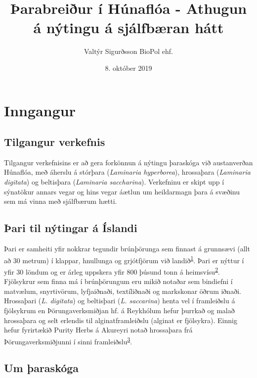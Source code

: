 \documentclass[icelandic,]{book}
\title{{Þarabreiður í Húnaflóa - Athugun á nýtingu á sjálfbæran hátt}}
\author{{Valtýr Sigurðsson}
BioPol ehf.}
\date{8. október 2019}
\begin{document}
\maketitle

{
\setcounter{tocdepth}{1}
\tableofcontents
}
\listoftables
\listoffigures
\hypertarget{inngangur}{%
\chapter{Inngangur}\label{inngangur}}

\hypertarget{tilgangur-verkefnis}{%
\section{Tilgangur verkefnis}\label{tilgangur-verkefnis}}

Tilgangur verkefnisins er að gera forkönnun á nýtingu þaraskóga við austanverðan Húnaflóa, með áherslu á stórþara (\emph{Laminaria hyperborea}), hrossaþara (\emph{Laminaria digitata}) og beltisþara (\emph{Laminaria saccharina}). Verkefninu er skipt upp í sýnatökur annars vegar og hins vegar áætlun um heildarmagn þara á svæðinu sem má vinna með sjálfbærum hætti.

\hypertarget{ari-til-nytingar-a-islandi}{%
\section{Þari til nýtingar á Íslandi}\label{ari-til-nytingar-a-islandi}}

Þari er samheiti yfir nokkrar tegundir brúnþörunga sem finnast á grunnsævi (allt að 30 metrum) í klappar, hnullunga og grjótfjörum við landið\textsuperscript{\protect\hyperlink{ref-karl1997}{1}}. Þari er nýttur í yfir 30 löndum og er árleg uppskera yfir 800 þúsund tonn á heimsvísu\textsuperscript{\protect\hyperlink{ref-Monagail2017}{2}}. Fjölsykrur sem finna má í brúnþörungum eru mikið notaðar sem bindiefni í matvælum, snyrtivörum, lyfjaiðnaði, textíliðnaði og markskonar öðrum iðnaði. Hrossaþari (\emph{L. digitata}) og beltisþari (\emph{L. saccarina}) henta vel í framleiðslu á fjölsykrum en Þörungaverksmiðjan hf. á Reykhólum hefur þurrkað og malað hrossaþara og selt erlendis til alginatframleiðslu (alginat er fjölsykra). Einnig hefur fyrirtækið Purity Herbs á Akureyri notað hrossaþara frá Þörungaverksmiðjunni í sinni framleiðslu\textsuperscript{\protect\hyperlink{ref-Jonsdottir2011}{3}}.

\hypertarget{um-araskoga}{%
\section{Um þaraskóga}\label{um-araskoga}}
\end{document}
